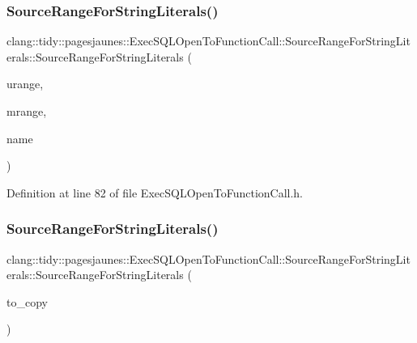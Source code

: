 \subsubsection{\texorpdfstring{Source\+Range\+For\+String\+Literals()}{SourceRangeForStringLiterals()}\hspace{0.1cm}{\footnotesize\ttfamily [2/6]}}
{\footnotesize\ttfamily clang\+::tidy\+::pagesjaunes\+::\+Exec\+S\+Q\+L\+Open\+To\+Function\+Call\+::\+Source\+Range\+For\+String\+Literals\+::\+Source\+Range\+For\+String\+Literals (\begin{DoxyParamCaption}\item[{Source\+Range}]{urange,  }\item[{Source\+Range}]{mrange,  }\item[{String\+Ref}]{name }\end{DoxyParamCaption})\hspace{0.3cm}{\ttfamily [inline]}}



Definition at line 82 of file Exec\+S\+Q\+L\+Open\+To\+Function\+Call.\+h.

\mbox{\label{classclang_1_1tidy_1_1pagesjaunes_1_1_exec_s_q_l_open_to_function_call_1_1_source_range_for_string_literals_afe2c6e559472bcc7267b91d11dc2673c}} 
\subsubsection{\texorpdfstring{Source\+Range\+For\+String\+Literals()}{SourceRangeForStringLiterals()}\hspace{0.1cm}{\footnotesize\ttfamily [3/6]}}
{\footnotesize\ttfamily clang\+::tidy\+::pagesjaunes\+::\+Exec\+S\+Q\+L\+Open\+To\+Function\+Call\+::\+Source\+Range\+For\+String\+Literals\+::\+Source\+Range\+For\+String\+Literals (\begin{DoxyParamCaption}\item[{\hyperlink{classclang_1_1tidy_1_1pagesjaunes_1_1_exec_s_q_l_open_to_function_call_1_1_source_range_for_string_literals}{Source\+Range\+For\+String\+Literals} \&}]{to\+\_\+copy }\end{DoxyParamCaption})\hspace{0.3cm}{\ttfamily [inline]}}



